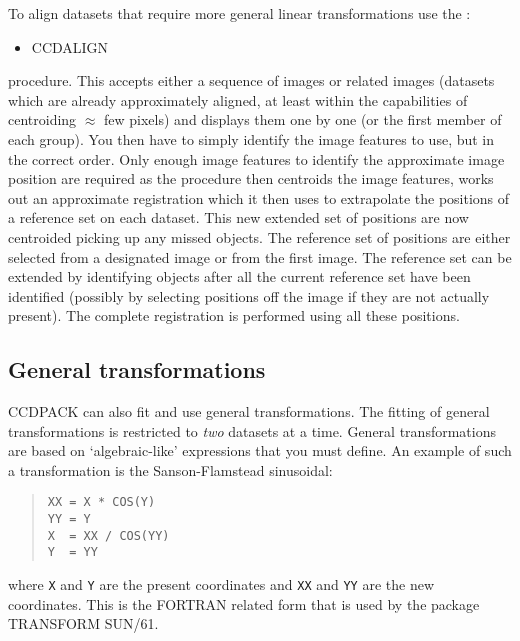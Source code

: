 \documentclass[twoside,11pt]{article}
\newcommand{\htmlref}[2]{#1}
\newcommand{\xref}[3]{#1}
\newcommand{\xlabel}[1]{}
\renewcommand{\_}{\texttt{\symbol{95}}}
\newenvironment{myquote}{\begin{quote}\begin{small}}{\end{small}\end{quote}}
\newcommand{\text}[1]{{\small \tt #1}}
\newcommand{\xroutine}[1]{\htmlref{{\sc #1}}{#1}}
\begin{document}
To align datasets that require more general linear transformations
use the :
\begin{itemize}
\item \xroutine{CCDALIGN}
\end{itemize}
procedure. This accepts either a sequence of images or related images
(datasets which are already approximately aligned, at least within the
capabilities of centroiding $\approx$ few pixels) and displays them one
by one (or the first member of each group). You then have to simply
identify the image features to use, but in the correct order. Only
enough image features to identify the approximate image position are
required as the  procedure then centroids the image features, works out
an approximate registration which it then uses to extrapolate the
positions of a reference set on each dataset. This new extended set of
positions are now centroided picking up any missed objects. The
reference set of positions are either selected from a designated image or
from the first image. The reference set can be extended by identifying
objects after all the current reference set have been identified
(possibly by selecting positions off the image if they are not actually
present). The complete registration is performed using all these
positions.

\subsection{\xlabel{generaltransforms}General transformations
\label{general_transforms}}
CCDPACK can also fit and use general transformations. The fitting of
general transformations is restricted to {\em two} datasets at a time.
General transformations are based on `algebraic-like' expressions
that you must define.
An example of such a transformation is the Sanson-Flamstead
sinusoidal:
\begin{myquote}
\begin{verbatim}
XX = X * COS(Y)
YY = Y
X  = XX / COS(YY)
Y  = YY
\end{verbatim}
\end{myquote}
where \text{X} and \text{Y} are the present coordinates and
\text{XX} and \text{YY} are the new coordinates.
This is the FORTRAN related form that is used by the package
\xref{TRANSFORM SUN/61}{sun61}{}.
\end{document}
